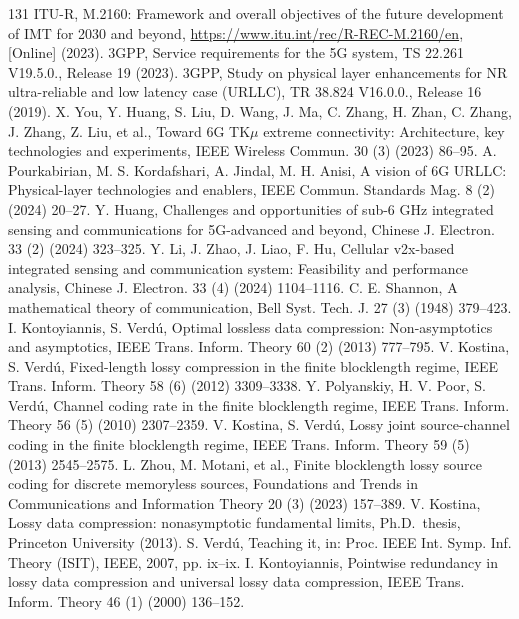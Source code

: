 \renewcommand{\refname}{참고문헌}
\begin{thebibliography}{131}\small
{} ITU-R, M.2160: Framework and overall objectives of the future development of IMT for 2030 and beyond, \url{https://www.itu.int/rec/R-REC-M.2160/en}, [Online] (2023).
 3GPP, Service requirements for the 5G system, TS 22.261 V19.5.0., Release 19 (2023).
 3GPP, Study on physical layer enhancements for NR ultra-reliable and low latency case (URLLC), TR 38.824 V16.0.0., Release 16 (2019).
 X. You, Y. Huang, S. Liu, D. Wang, J. Ma, C. Zhang, H. Zhan, C. Zhang, J. Zhang, Z. Liu, et al., Toward 6G TK$\mu$ extreme connectivity: Architecture, key technologies and experiments, IEEE Wireless Commun. 30 (3) (2023) 86--95.
 A. Pourkabirian, M. S. Kordafshari, A. Jindal, M. H. Anisi, A vision of 6G URLLC: Physical-layer technologies and enablers, IEEE Commun. Standards Mag. 8 (2) (2024) 20--27.
 Y. Huang, Challenges and opportunities of sub-6 GHz integrated sensing and communications for 5G-advanced and beyond, Chinese J. Electron. 33 (2) (2024) 323--325.
 Y. Li, J. Zhao, J. Liao, F. Hu, Cellular v2x-based integrated sensing and communication system: Feasibility and performance analysis, Chinese J. Electron. 33 (4) (2024) 1104--1116.
 C. E. Shannon, A mathematical theory of communication, Bell Syst. Tech. J. 27 (3) (1948) 379--423.
 I. Kontoyiannis, S. Verdú, Optimal lossless data compression: Non-asymptotics and asymptotics, IEEE Trans. Inform. Theory 60 (2) (2013) 777--795.
 V. Kostina, S. Verdú, Fixed-length lossy compression in the finite blocklength regime, IEEE Trans. Inform. Theory 58 (6) (2012) 3309--3338.
 Y. Polyanskiy, H. V. Poor, S. Verdú, Channel coding rate in the finite blocklength regime, IEEE Trans. Inform. Theory 56 (5) (2010) 2307--2359.
 V. Kostina, S. Verdú, Lossy joint source-channel coding in the finite blocklength regime, IEEE Trans. Inform. Theory 59 (5) (2013) 2545--2575.
 L. Zhou, M. Motani, et al., Finite blocklength lossy source coding for discrete memoryless sources, Foundations and Trends\textregistered{} in Communications and Information Theory 20 (3) (2023) 157--389.
 V. Kostina, Lossy data compression: nonasymptotic fundamental limits, Ph.D.\ thesis, Princeton University (2013).
 S. Verdú, Teaching it, in: Proc. IEEE Int. Symp. Inf. Theory (ISIT), IEEE, 2007, pp. ix--ix.
 I. Kontoyiannis, Pointwise redundancy in lossy data compression and universal lossy data compression, IEEE Trans. Inform. Theory 46 (1) (2000) 136--152.

\end{thebibliography}
